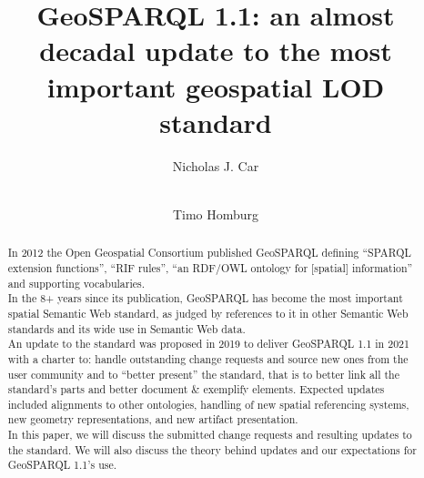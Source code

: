 \documentclass[runningheads]{llncs}
\begin{document}
\title{GeoSPARQL 1.1: an almost decadal update to the most important geospatial LOD standard}

\author{
    Nicholas J. Car \and \\
    Timo Homburg
}



\maketitle

\begin{abstract}
In 2012 the Open Geospatial Consortium published GeoSPARQL 
defining ``SPARQL extension functions'', ``RIF rules'', ``an RDF/OWL ontology for [spatial] information'' and supporting vocabularies.\\

In the 8+ years since its publication, GeoSPARQL has become the most important spatial Semantic 
Web standard, as judged by references to it in other Semantic Web standards and its wide use in 
Semantic Web data.\\

An update to the standard was proposed in 2019 to deliver GeoSPARQL 1.1 in 2021 with a charter to: 
handle outstanding change requests and source new ones from the user community and 
to ``better present'' the standard, that is to better link all the standard’s parts and better 
document \& exemplify elements. Expected updates included alignments to other ontologies, 
handling of new spatial referencing systems, new geometry representations, and new artifact 
presentation.\\

In this paper, we will discuss the submitted change requests and resulting updates to the standard. 
We will also discuss the theory behind updates and our expectations for GeoSPARQL 1.1's use.

\end{abstract}
\end{document}
